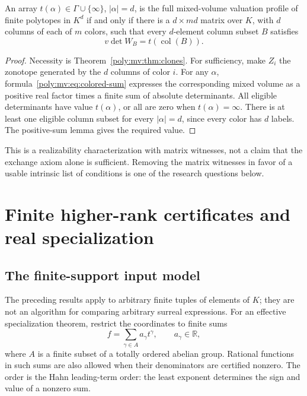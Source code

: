 \documentclass[11pt,a4paper]{article}
\numberwithin{equation}{section}
\theoremstyle{plain}
\newcommand{\R}{\mathbb R}
\begin{document}
\begin{corollary}
\label{poly:mv:cor:full-characterization}
An array $t(\alpha)\in\Gamma\cup\{\infty\}$, $|\alpha|=d$, is the full
mixed-volume valuation profile of finite polytopes in $K^d$ if and only if
there is a $d\times md$ matrix over $K$, with $d$ columns of each of $m$
colors, such that every $d$-element column subset $B$ satisfies
\[
 v\det W_B=t(\operatorname{col}(B)).
\]
\end{corollary}
\begin{proof}
Necessity is Theorem~\ref{poly:mv:thm:clones}. For sufficiency, make $Z_i$ the
zonotope generated by the $d$ columns of color $i$. For any $\alpha$,
formula~\eqref{poly:mv:eq:colored-sum} expresses the corresponding mixed volume
as a positive real factor times a finite sum of absolute determinants.
All eligible determinants have value $t(\alpha)$, or all are zero when
$t(\alpha)=\infty$. There is at least one eligible column subset for
every $|\alpha|=d$, since every color has $d$ labels. The positive-sum
lemma gives the required value.
\end{proof}

This is a realizability characterization with matrix witnesses, not a
claim that the exchange axiom alone is sufficient. Removing the matrix
witnesses in favor of a usable intrinsic list of conditions is one of the
research questions below.

\section{Finite higher-rank certificates and real specialization}
\label{poly:mv:sec:compression}

\subsection{The finite-support input model}
The preceding results apply to arbitrary finite tuples of elements of
$K$; they are not an algorithm for comparing arbitrary surreal expressions.
For an effective specialization theorem, restrict the coordinates to
finite sums
\[
 f=\sum_{\gamma\in A}a_\gamma t^\gamma,
 \qquad a_\gamma\in\R,
\]
where $A$ is a finite subset of a totally ordered abelian group. Rational
functions in such sums are also allowed when their denominators are
certified nonzero. The order is the Hahn leading-term order: the least
exponent determines the sign and value of a nonzero sum.
\end{document}
